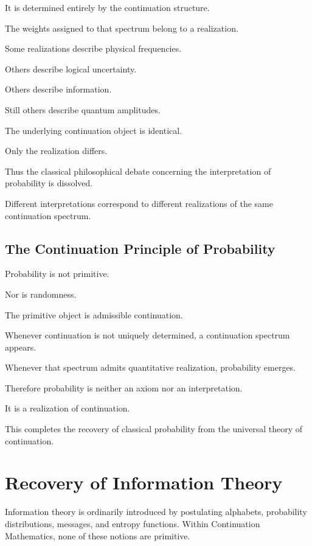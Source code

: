 \documentclass[13pt,openany]{book}
\theoremstyle{plain}
\theoremstyle{definition}
\begin{document}
It is determined entirely by the continuation structure.

The weights assigned to that spectrum belong to a realization.

Some realizations describe physical frequencies.

Others describe logical uncertainty.

Others describe information.

Still others describe quantum amplitudes.

The underlying continuation object is identical.

Only the realization differs.

Thus the classical philosophical debate concerning the interpretation of
probability is dissolved.

Different interpretations correspond to different realizations of the same
continuation spectrum.

\section{The Continuation Principle of Probability}

Probability is not primitive.

Nor is randomness.

The primitive object is admissible continuation.

Whenever continuation is not uniquely determined, a continuation spectrum
appears.

Whenever that spectrum admits quantitative realization, probability emerges.

Therefore probability is neither an axiom nor an interpretation.

It is a realization of continuation.

This completes the recovery of classical probability from the universal theory
of continuation.

\chapter{Recovery of Information Theory}

Information theory is ordinarily introduced by postulating alphabets, probability
distributions, messages, and entropy functions. Within Continuation Mathematics,
none of these notions are primitive.
\end{document}
